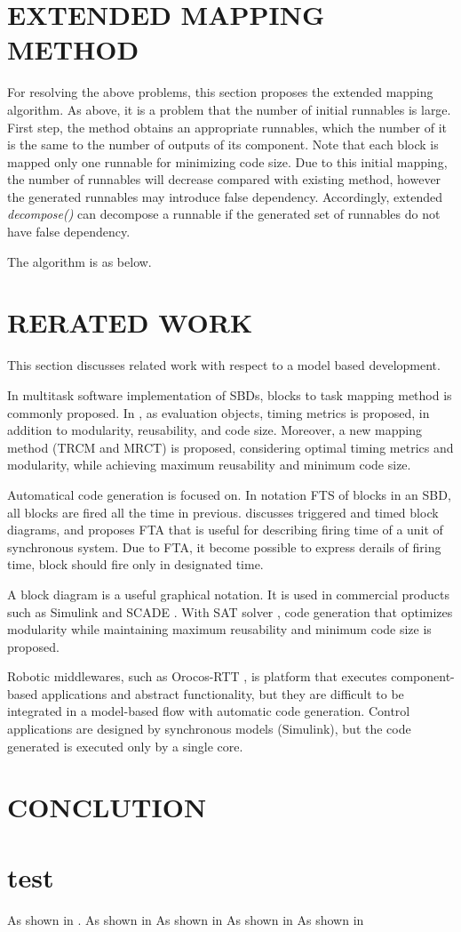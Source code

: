 \documentclass[conference,compsoc]{IEEEtran}
\begin{document}
\section{EXTENDED MAPPING METHOD}
 For resolving the above problems, this section proposes the extended mapping algorithm.
As above, it is a problem that the number of initial runnables is large.
First step, the method obtains an appropriate runnables, which the number of it is the same to the number of outputs of its component.
Note that each block is mapped only one runnable for minimizing code size.
Due to this initial mapping, the number of runnables will decrease compared with existing method, however the generated runnables may introduce false dependency.
Accordingly, extended {\it decompose()} can decompose a runnable if the generated set of runnables do not have false dependency.

The algorithm is as below.


\section{RERATED WORK}
 This section discusses related work with respect to a model based development.

 In multitask software implementation of SBDs, blocks to task mapping method is commonly proposed.
In \cite{6871195}, as evaluation objects, timing metrics is proposed, in addition to modularity, reusability, and code size.
Moreover, a new mapping method (TRCM and MRCT) is proposed, considering optimal timing metrics and modularity, while achieving maximum reusability and minimum code size. 

 Automatical code generation is focused on.
In notation FTS of blocks in an SBD, all blocks are fired all the time in previous. 
\cite{4550788} discusses triggered and timed block diagrams, and proposes FTA that is useful for describing firing time of a unit of synchronous system.
Due to FTA, it become possible to express derails of firing time, block should fire only in designated time.

 A block diagram is a useful graphical notation. 
It is used in commercial products such as Simulink and SCADE \cite{Lublinerman:2009:MCG:1480881.1480893}.
With SAT solver \cite{Lublinerman:2009:MCG:1480881.1480893}, code generation that optimizes modularity while maintaining maximum reusability and minimum code size is proposed.

 Robotic middlewares, such as Orocos-RTT \cite{}, is platform that executes component-based applications and abstract functionality, but they are difficult to be integrated in a model-based flow with automatic code generation.
 Control applications are designed by synchronous models (Simulink), but the code generated is executed only by a single core.

\section{CONCLUTION}

\section{test}

As shown in \cite{Deng:2015:MSF:2735960.2735972}.
As shown in \cite{6871195}
As shown in \cite{4550788}
As shown in \cite{Lublinerman:2009:MCG:1480881.1480893}
As shown in \cite{Ptolemaeus:14:SystemDesign}


\end{document}
